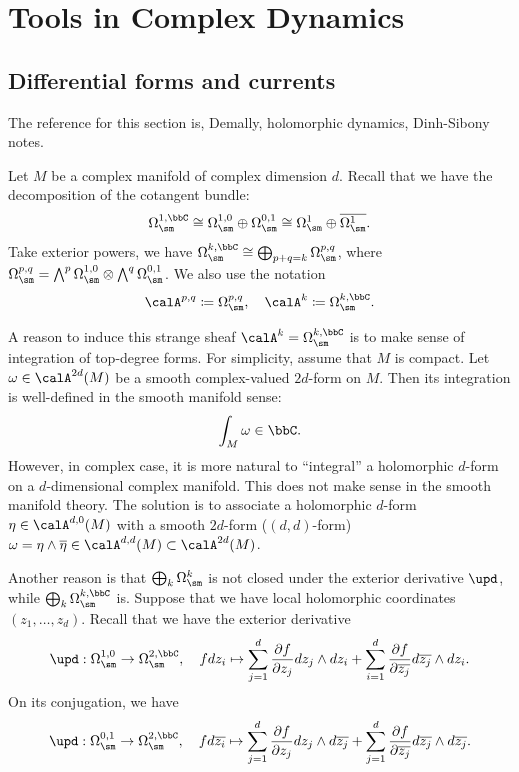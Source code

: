 \section{Tools in Complex Dynamics}


\subsection{Differential forms and currents}

The reference for this section is, Demally, holomorphic dynamics, Dinh-Sibony notes. \Yang{}
\cite{Dinh-Sibony-2005-introduction-to-currents}

Let \(M\) be a complex manifold of complex dimension \(d\).
Recall that we have the decomposition of the cotangent bundle:
\[ \Omega_{\sm}^{1,\bbC} \cong \Omega_{\sm}^{1,0} \oplus \Omega_{\sm}^{0,1} \cong \Omega_{\sm}^1 \oplus \overline{\Omega_{\sm}^1}. \]
Take exterior powers, we have \( \Omega_{\sm}^{k,\bbC} \cong \bigoplus_{p+q=k} \Omega_{\sm}^{p,q} \),
where \(\Omega_{\sm}^{p,q} = \bigwedge^p \Omega_{\sm}^{1,0} \otimes \bigwedge^q \Omega_{\sm}^{0,1}\).
We also use the notation
\[ \calA^{p,q} \coloneqq \Omega_{\sm}^{p,q}, \quad \calA^{k} \coloneqq \Omega_{\sm}^{k,\bbC}. \]

A reason to induce this strange sheaf \(\calA^{k} = \Omega_{\sm}^{k,\bbC}\) is to make sense of integration of top-degree forms.
For simplicity, assume that \(M\) is compact.
Let \(\omega \in \calA^{2d}(M)\) be a smooth complex-valued \(2d\)-form on \(M\).
Then its integration is well-defined in the smooth manifold sense:
\[ \int_M \omega \in \bbC. \]
However, in complex case, it is more natural to ``integral'' a holomorphic \(d\)-form on a \(d\)-dimensional complex manifold.
This does not make sense in the smooth manifold theory.
The solution is to associate a holomorphic \(d\)-form \(\eta \in \calA^{d,0}(M)\) with a smooth \(2d\)-form (\((d,d)\)-form) \(\omega = \eta \wedge \overline{\eta} \in \calA^{d,d}(M) \subset \calA^{2d}(M)\).

Another reason  is that \(\bigoplus_k \Omega_{\sm}^{k}\) is not closed under the exterior derivative \(\upd\), while \(\bigoplus_k \Omega_{\sm}^{k,\bbC}\) is.
Suppose that we have local holomorphic coordinates \((z_1, \ldots, z_d)\).
Recall that we have the exterior derivative
\[ \upd: \Omega_{\sm}^{1,0} \to \Omega_{\sm}^{2,\bbC}, \quad f d z_{i} \mapsto \sum_{j=1}^d \frac{\partial f}{\partial z_j} d z_j \wedge d z_{i} + \sum_{i=1}^d \frac{\partial f}{\partial \overline{z_j}} d \overline{z_j} \wedge d z_{i}. \]
On its conjugation, we have
\[ \upd: \Omega_{\sm}^{0,1} \to \Omega_{\sm}^{2,\bbC}, \quad f d \overline{z_{i}} \mapsto \sum_{j=1}^d \frac{\partial f}{\partial z_j} d z_j \wedge d \overline{z_{j}} + \sum_{j=1}^d \frac{\partial f}{\partial \overline{z_j}} d \overline{z_j} \wedge d \overline{z_{j}}. \]

